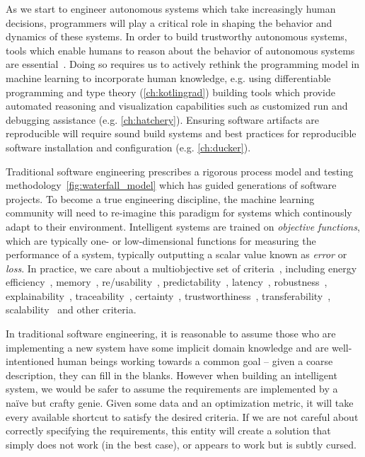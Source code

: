 As we start to engineer autonomous systems which take increasingly human decisions, programmers will play a critical role in shaping the behavior and dynamics of these systems. In order to build trustworthy autonomous systems, tools which enable humans to reason about the behavior of autonomous systems are essential~\citep{famelis2012partial}. Doing so requires us to actively rethink the programming model in machine learning to incorporate human knowledge, e.g. using differentiable programming and type theory (\autoref{ch:kotlingrad}) building tools which provide automated reasoning and visualization capabilities such as customized run and debugging assistance (e.g. \autoref{ch:hatchery}). Ensuring software artifacts are reproducible will require sound build systems and best practices for reproducible software installation and configuration (e.g. \autoref{ch:ducker}).

Traditional software engineering prescribes a rigorous process model and testing methodology~\autoref{fig:waterfall_model} which has guided generations of software projects. To become a true engineering discipline, the machine learning community will need to re-imagine this paradigm for systems which continously adapt to their environment. Intelligent systems are trained on \textit{objective functions}, which are typically one- or low-dimensional functions for measuring the performance of a system, typically outputting a scalar value known as \textit{error} or \textit{loss}. In practice, we care about a multiobjective set of criteria~\citep{censi2015mathematical}, including energy efficiency~\citep{paull2010novel}, memory~\citep{memory2013mitliagkas}, re/usability~\citep{breuleux2017automatic, deleu2019torchmeta}, predictability~\citep{turner2017well}, latency~\citep{ravanelli2018twin}, robustness~\citep{pineau2003policy}, explainability~\citep{turner2016model}, traceability~\citep{guo2017semantically, tsirigotis2018orion}, certainty~\citep{diaz2018interactive}, trustworthiness~\citep{xu2017efficient}, transferability~\citep{mehta2019active}, scalability~\citep{luan2019break} and other criteria.

In traditional software engineering, it is reasonable to assume those who are implementing a new system have some implicit domain knowledge and are well-intentioned human beings working towards a common goal -- given a coarse description, they can fill in the blanks. However when building an intelligent system, we would be safer to assume the requirements are implemented by a na\"ive but crafty genie. Given some data and an optimization metric, it will take every available shortcut to satisfy the desired criteria. If we are not careful about correctly specifying the requirements, this entity will create a solution that simply does not work (in the best case), or appears to work but is subtly cursed.

